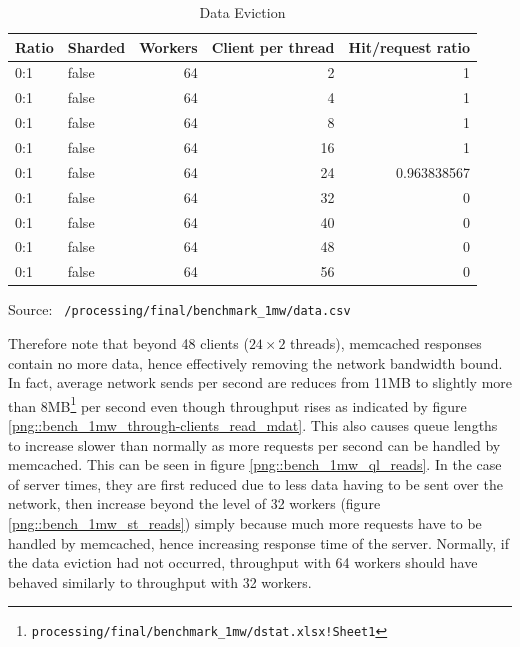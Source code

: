 \documentclass[11pt,a4paper]{article}
\newcommand{\source}[1]{\vspace{-1em}\caption*{\tiny{Source: \texttt{ {#1} }}} }
\begin{document}
\begin{table}[!h]
    \centering
    \begin{tabular}{|l|l|r|r|r|}
        \hline Ratio & Sharded & Workers & Client per thread & Hit/request ratio \\
        \hline 0:1 & false & 64 & 2 & 1 \\
        \hline 0:1 & false & 64 & 4 & 1 \\
        \hline 0:1 & false & 64 & 8 & 1 \\
        \hline 0:1 & false & 64 & 16 & 1 \\
        \hline 0:1 & false & 64 & 24 & 0.963838567 \\
        \hline 0:1 & false & 64 & 32 & 0 \\
        \hline 0:1 & false & 64 & 40 & 0 \\
        \hline 0:1 & false & 64 & 48 & 0 \\
        \hline 0:1 & false & 64 & 56 & 0 \\
        \hline
    \end{tabular}
    \caption{Data Eviction}
    \source{/processing/final/benchmark\_1mw/data.csv}
    \label{table::data_eviction}
\end{table}

Therefore note that beyond 48 clients ($24\times2$ threads), memcached responses contain no more data, hence effectively removing the network bandwidth bound. In fact, average network sends per second are reduces from 11MB to slightly more than 8MB\footnote{\texttt{processing/final/benchmark_1mw/dstat.xlsx!Sheet1}} per second even though throughput rises as indicated by figure \ref{png::bench_1mw_through-clients_read_mdat}. This also causes queue lengths to increase slower than normally as more requests per second can be handled by memcached. This can be seen in figure \ref{png::bench_1mw_ql_reads}. In the case of server times, they are first reduced due to less data having to be sent over the network, then increase beyond the level of 32 workers (figure \ref{png::bench_1mw_st_reads}) simply because much more requests have to be handled by memcached, hence increasing response time of the server. Normally, if the data eviction had not occurred, throughput with 64 workers should have behaved similarly to throughput with 32 workers.
\end{document}

